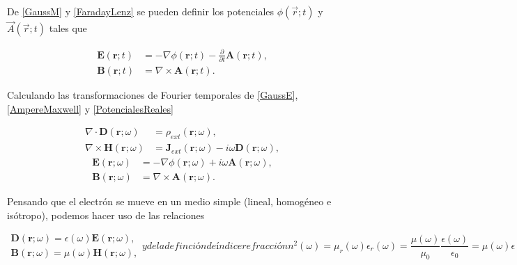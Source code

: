 \documentclass[a4paper,10pt]{article}
\begin{document}
De \eqref{GaussM} y \eqref{FaradayLenz} se pueden definir los potenciales $\phi(\vec{r};t)$ y $\vec{A}(\vec{r};t)$ tales que

\begin{subequations}
\begin{align}
\textbf{E}(\textbf{r};t)	&=-\nabla\phi(\textbf{r};t) -\frac{\partial}{\partial t}\textbf{A}(\textbf{r};t),	\\
\textbf{B}(\textbf{r};t)	&=\nabla\times\textbf{A}(\textbf{r};t).
\end{align}
\label{PotencialesReales}
\end{subequations}

Calculando las transformaciones de Fourier temporales de \eqref{GaussE},\eqref{AmpereMaxwell} y \eqref{PotencialesReales}

\begin{subequations}
\begin{align}
\nabla\cdot\textbf{D}(\textbf{r};\omega)	&=\mathcal{\rho}_{ext}(\textbf{r};\omega),	\\
\nabla\times\textbf{H}(\textbf{r};\omega)	&=\textbf{J}_{ext}(\textbf{r};\omega)-i\omega\textbf{D}(\textbf{r};\omega),
\end{align}
\label{Eq2.3}
\end{subequations}
\begin{subequations}
\begin{align}
\textbf{E}(\textbf{r};\omega)	&= -\nabla\phi(\textbf{r};\omega) +i\omega\textbf{A}(\textbf{r};\omega),	\\
\textbf{B}(\textbf{r};\omega)	&=\nabla\times\textbf{A}(\textbf{r};\omega).
\end{align}
\label{Eq2.4}
\end{subequations}

Pensando que el electrón se mueve en un medio simple (lineal, homogéneo e isótropo), podemos hacer uso de las relaciones

\begin{subequations}
\begin{align}
\textbf{D}(\textbf{r};\omega)=\epsilon(\omega)\textbf{E}(\textbf{r};\omega),	\\
\textbf{B}(\textbf{r};\omega)=\mu(\omega)\textbf{H}(\textbf{r};\omega),
\end{align}
y de la definción de índice refracción
\begin{equation}
n^2(\omega)=\mu_r (\omega) \epsilon_r (\omega)= \frac{\mu(\omega)}{\mu_0} \frac{\epsilon(\omega)}{\epsilon_0}=\mu(\omega)\epsilon(\omega)c^2
\end{equation}
\label{lineal}
\end{subequations}
\end{document}
